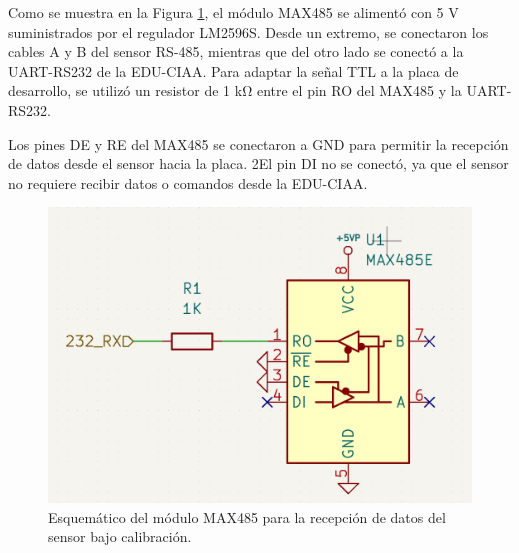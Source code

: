 
Como se muestra en la Figura \ref{fig:esquemRS485}, el módulo MAX485 se alimentó con 5 \unit{\volt} suministrados por el regulador LM2596S. Desde un extremo, se conectaron los cables A y B del sensor RS-485, mientras que del otro lado se conectó a la UART-RS232 de la EDU-CIAA. Para adaptar la señal TTL a la placa de desarrollo, se utilizó un resistor de 1 \unit{\kilo\ohm} entre el pin RO del MAX485 y la UART-RS232.

Los pines DE y RE del MAX485 se conectaron a GND para permitir la recepción de datos desde el sensor hacia la placa. 2El pin DI no se conectó, ya que el sensor no requiere recibir datos o comandos desde la EDU-CIAA.

\begin{figure}[H]
    \centering
    \includegraphics[width=0.5\linewidth]{Figuras/datalogger/Hardware/esquemRS485.png}
    \caption{Esquemático del módulo MAX485 para la recepción de datos del sensor bajo calibración.}
    \label{fig:esquemRS485}
\end{figure}


